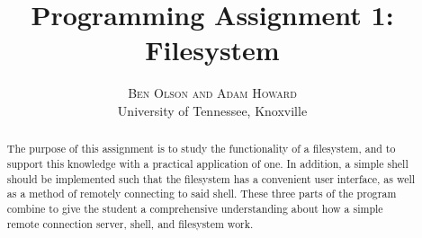 \documentclass[twoside]{article}
\title{\vspace{-15mm}\fontsize{24pt}{10pt}\selectfont\textbf{Programming
Assignment 1: Filesystem}} %
\author{
\large
\textsc{Ben Olson and Adam Howard} \\[2mm] %
\normalsize University of Tennessee, Knoxville \\ %
\vspace{-5mm}
}
\date{}
\begin{document}
\maketitle %

\thispagestyle{fancy} %


\begin{abstract}

  The purpose of this assignment is to study the functionality of a filesystem,
  and to support this knowledge with a practical application of one. In
  addition, a simple shell should be implemented such that the filesystem has a
  convenient user interface, as well as a method of remotely connecting to said
  shell. These three parts of the program combine to give the student a
  comprehensive understanding about how a simple remote connection server,
  shell, and filesystem work.

\end{abstract}

\end{document}
